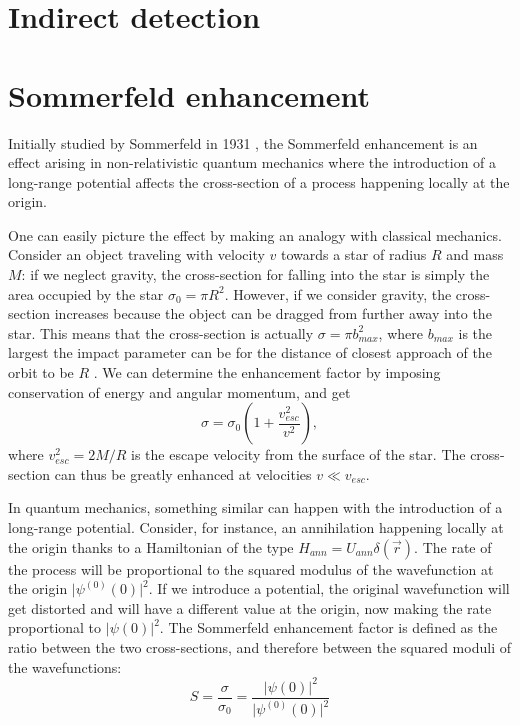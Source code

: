 \section{Indirect detection}

\section{Sommerfeld enhancement}

Initially studied by Sommerfeld in 1931 \cite{Sommerfeld_1931}, the Sommerfeld enhancement is an effect arising in non-relativistic quantum mechanics where the introduction of a long-range potential affects the cross-section of a process happening locally at the origin.

One can easily picture the effect by making an analogy with classical mechanics. Consider an object traveling with velocity \(v\) towards a star of radius \(R\) and mass \(M\): if we neglect gravity, the cross-section for falling into the star is simply the area occupied by the star \(\sigma _0=\pi R^2\). However, if we consider gravity, the cross-section increases because the object can be dragged from further away into the star. This means that the cross-section is actually \(\sigma = \pi b_{max}^2 \), where \(b_{max}\) is the largest the impact parameter can be for the distance of closest approach of the orbit to be \(R\) \cite{Arkani_2009, Cirelli_2024}. We can determine the enhancement factor by imposing conservation of energy and angular momentum, and get
\begin{equation}
	\sigma = \sigma _0 \left( 1+ \frac{v_{esc} ^2}{v ^2} \right), 
\end{equation}
where \(v_{esc} ^2 = 2M / R\) is the escape velocity from the surface of the star. The cross-section can thus be greatly enhanced at velocities \(v \ll v_{esc} \).

In quantum mechanics, something similar can happen with the introduction of a long-range potential. Consider, for instance, an annihilation happening locally at the origin thanks to a Hamiltonian of the type \(H_{ann} = U_{ann} \delta (\vec{r})\). The rate of the process will be proportional to the squared modulus of the wavefunction at the origin \(\vert \psi ^{(0)}(0) \vert^2 \). If we introduce a potential, the original wavefunction will get distorted and will have a different value at the origin, now making the rate proportional to \(\vert \psi (0) \vert^2 \). The Sommerfeld enhancement factor is defined as the ratio between the two cross-sections, and therefore between the squared moduli of the wavefunctions:
\begin{equation}\label{eq:sommerfeld_def}
	S = \frac{\sigma }{\sigma _0} = \frac{\vert \psi (0) \vert ^2}{\vert \psi ^{(0)}(0) \vert ^2}
\end{equation}

